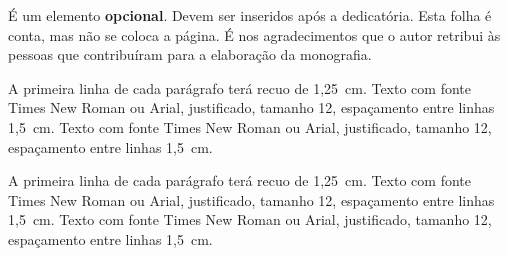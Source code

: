 É um elemento \textbf{opcional}. Devem ser inseridos após a dedicatória. Esta folha é
conta, mas não se coloca a página. É nos agradecimentos que o autor retribui
às pessoas que contribuíram para a elaboração da monografia.

A primeira linha de cada parágrafo terá recuo de 1,25~cm. Texto com fonte
Times New Roman ou Arial, justificado, tamanho 12, espaçamento entre linhas
1,5~cm. Texto com fonte Times New Roman ou Arial, justificado, tamanho 12,
espaçamento entre linhas 1,5~cm.

A primeira linha de cada parágrafo terá recuo de 1,25~cm. Texto com fonte
Times New Roman ou Arial, justificado, tamanho 12, espaçamento entre linhas
1,5~cm. Texto com fonte Times New Roman ou Arial, justificado, tamanho 12,
espaçamento entre linhas 1,5~cm.
